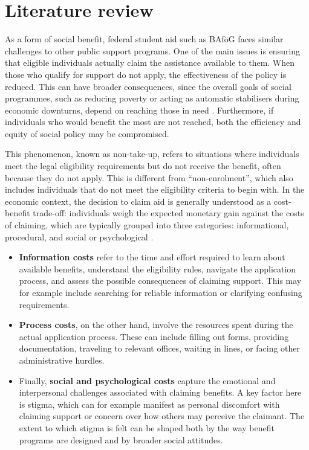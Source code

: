 \section{Literature review}
\label{section:literature_review}

As a form of social benefit, federal student aid such as BAföG faces similar challenges to other public support programs. One of the main issues is ensuring that eligible individuals actually claim the assistance available to them. When those who qualify for support do not apply, the effectiveness of the policy is reduced. This can have broader consequences, since the overall goals of social programmes, such as reducing poverty or acting as automatic stabilisers during economic downturns, depend on reaching those in need \citep{goedeme_concept_2020}. Furthermore, if individuals who would benefit the most are not reached, both the efficiency and equity of social policy may be compromised.

This phenomenon, known as non-take-up, refers to situations where individuals meet the legal eligibility requirements but do not receive the benefit, often because they do not apply.
This is different from “non-enrolment”, which also includes individuals that do not meet the eligibility criteria to begin with. In the economic context, the decision to claim aid is generally understood as a cost-benefit trade-off: individuals weigh the expected monetary gain against the costs of claiming, which are typically grouped into three categories: informational, procedural, and social or psychological \citep{booij_role_2012}. 

\begin{itemize}
  \item \textbf{Information costs} refer to the time and effort required to learn about available benefits, understand the eligibility rules, navigate the application process, and assess the possible consequences of claiming support. This may for example include searching for reliable information or clarifying confusing requirements.
  \item \textbf{Process costs}, on the other hand, involve the resources spent during the actual application process. These can include filling out forms, providing documentation, traveling to relevant offices, waiting in lines, or facing other administrative hurdles.
  \item Finally, \textbf{social and psychological costs} capture the emotional and interpersonal challenges associated with claiming benefits. A key factor here is stigma, which can for example manifest as personal discomfort with claiming support or concern over how others may perceive the claimant. The extent to which stigma is felt can be shaped both by the way benefit programs are designed and by broader social attitudes.
\end{itemize}

